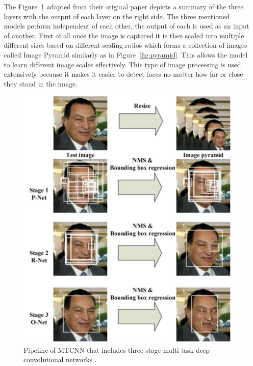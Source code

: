 The Figure~\ref{fig:mtcnn} adapted from their original paper depicts a summary of the three layers with the output of each layer on the right side. The three mentioned models perform independent of each other, the output of each is used as an input of another. 
First of all once the image is captured it is then scaled into multiple different sizes based on different scaling ratios which forms a collection of images called Image Pyramid similarly as in Figure~\ref{fig:pyramid}. This allows the model to learn different image scales effectively. This type of image processing is used extensively because it makes it easier to detect faces no matter how far or close they stand in the image.


\begin{figure}[!htb]
    \centering
    \includegraphics[width=1\textwidth]{figures/mtcnn.png}
    \caption{ Pipeline of MTCNN that includes three-stage multi-task deep convolutional networks \cite{refmtcnn}.}
    \label{fig:mtcnn}
\end{figure}


